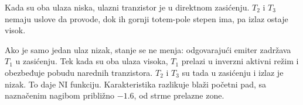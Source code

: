 Kada su oba ulaza niska, ulazni tranzistor je u direktnom zasićenju. $T_2$ i $T_3$ nemaju uslove da provode, dok ih gornji totem-pole stepen ima, pa izlaz ostaje visok.

Ako je samo jedan ulaz nizak, stanje se ne menja: odgovarajući emiter zadržava $T_1$ u zasićenju. Tek kada su oba ulaza visoka, $T_1$ prelazi u inverzni aktivni režim i obezbeđuje pobudu narednih tranzistora. $T_2$ i $T_3$ su tada u zasićenju i izlaz je nizak. To daje NI funkciju. Karakteristika razlikuje blaži početni pad, sa naznačenim nagibom približno $-1.6$, od strme prelazne zone.
